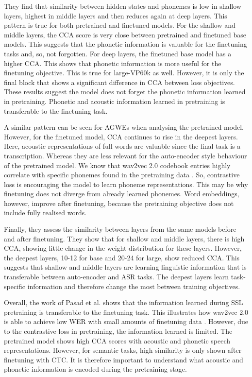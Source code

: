 They find that similarity between hidden states and phonemes is low in shallow layers, highest in middle layers and then reduces again at deep layers. This pattern is true for both pretrained and finetuned models. For the shallow and middle layers, the CCA score is very close between pretrained and finetuned base models. This suggests that the phonetic information is valuable for the finetuning tasks and, so, not forgotten. For deep layers, the finetuned base model has a higher CCA. This shows that phonetic information is more useful for the finetuning objective. This is true for large-VP60k as well. However, it is only the final block that shows a significant difference in CCA between loss objectives. These results suggest the model does not forget the phonetic information learned in pretraining. Phonetic and acoustic information learned in pretraining is transferable to the finetuning task.

A similar pattern can be seen for AGWEs when analysing the pretrained model. However, for the finetuned model, CCA continues to rise in the deepest layers. Here, acoustic representations of full words are valuable since the final task is a transcription. Whereas they are less relevant for the auto-encoder style behaviour of the pretrained model. We know that wav2vec 2.0 codebook entries highly correlate with specific phonemes found in the pretraining data \cite{wav2vec}. So, contrastive loss is encouraging the model to learn phoneme representations. This may be why finetuning does not diverge from already learned phonemes. Word embeddings, however, improve after finetuning, because the pretraining objective does not include fully realised words.

Finally, they assess the similarity between layers from the same models before and after finetuning. They show that for shallow and middle layers, there is high CCA, showing little change in the weight distribution for these layers. However, the deepest layers, 10-12 for base and 20-24 for large, show reduced CCA. This suggests that shallow and middle layers are learning linguistic information that is transferable between auto-encoder and ASR tasks. The deepest layers learn task-specific information and therefore change the most between training objectives.

Overall, the work of Pasad et al. \cite{pasad2021layer} shows that the information learned during SSL pretraining is transferable to the finetuning task. This illustrates how wav2vec 2.0 is able to achieve low WER with small amounts of finetuning data \cite{wav2vec}. However, due to the contrastive loss in pretraining, the information learned is limited. The pretrained model shows high CCA scores with acoustic and phonetic speech representations. However, for semantic tasks, high similarity is only shown after finetuning with CTC. It is therefore important to understand what acoustic and phonetic information is encoded during the pretraining stage.

